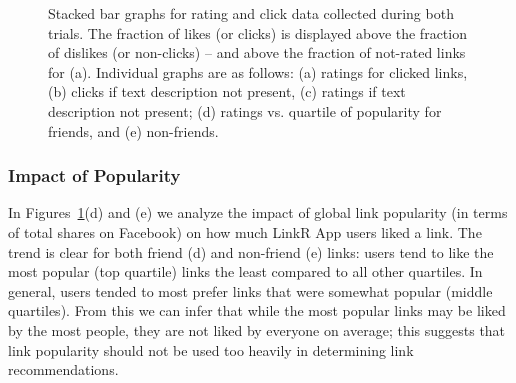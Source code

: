 \begin{figure}[t!]
\vspace{-3mm}
\caption{Stacked bar graphs for rating and click data collected during both
trials.  The fraction of likes (or clicks) is displayed above 
the fraction of dislikes (or non-clicks) -- and above the fraction of not-rated
links for (a).  Individual graphs are as follows: 
(a) ratings for clicked links, (b) clicks if
text description not present, (c) ratings if
text description not present; (d) ratings
vs. quartile of popularity for friends, and (e) non-friends.}
\label{fig:click_evidence}
\end{figure}

\subsubsection{Impact of Popularity}

In Figures~\ref{fig:click_evidence}(d) and (e) we analyze the impact of
global link popularity (in terms of total shares on Facebook) on how
much LinkR App users liked a link.  The trend is clear for both friend
(d) and non-friend (e) links: users tend to like the most popular (top
quartile) links the least compared to all other quartiles.  In
general, users tended to most prefer links that were somewhat popular
(middle quartiles).  From this we can infer that while the most
popular links may be liked by the most people, they are not liked by
everyone on average; this suggests that link popularity should not be used too
heavily in determining link recommendations.

